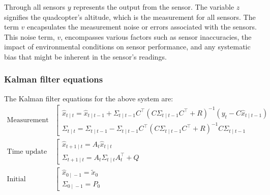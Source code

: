 \documentclass{article}
\begin{document}
    Through all sensors \( y \) represents the output from the sensor. The variable \( z \) signifies the quadcopter's altitude, which is the measurement for all sensors. The term \( v \) encapsulates the measurement noise or errors associated with the sensors. This noise term, \( v \), encompasses various factors such as sensor inaccuracies, the impact of environmental conditions on sensor performance, and any systematic bias that might be inherent in the sensor's readings.



\subsubsection*{Kalman filter equations}
The Kalman filter equations for the above system are:
\begin{align}
    \text{Measurement} &
    \left[
    \begin{array}{l}
      \hat{x}_{t{}\mid{}t}
      {}={}
      \hat{x}_{t{}\mid{}t-1}
      {}+{}
      \Sigma_{t{}\mid{}t-1}C^\intercal
      (C\Sigma_{t{}\mid{}t-1}C^\intercal + R)^{-1}(y_t - C\hat{x}_{t{}\mid{}t-1})
      \\
      \Sigma_{t{}\mid{}t}
      {}={}
      \Sigma_{t{}\mid{}t-1}
      {}-{}
      \Sigma_{t{}\mid{}t-1}C^\intercal
      (C\Sigma_{t{}\mid{}t-1}C^\intercal + R)^{-1}
      C\Sigma_{t{}\mid{}t-1}
    \end{array}
    \right.
    \\
    \text{Time update}        &
    \left[
    \begin{array}{l}
      \hat{x}_{t+1{}\mid{}t}
      {}={}
      A_t \hat{x}_{t{}\mid{}t}
      \\
      \Sigma_{t+1{}\mid{}t}
      {}={}
      A_t \Sigma_{t{}\mid{}t} A_t^\intercal + Q
    \end{array}
    \right.
    \\
    \text{Initial conditions} &
    \left[
    \begin{array}{l}
      \hat{x}_{0{}\mid{}-1}
      {}={}
      \tilde{x}_0
      \\
      \Sigma_{0{}\mid{}-1}
      {}={}
      P_0
    \end{array}
    \right.
  \end{align}
\end{document}
